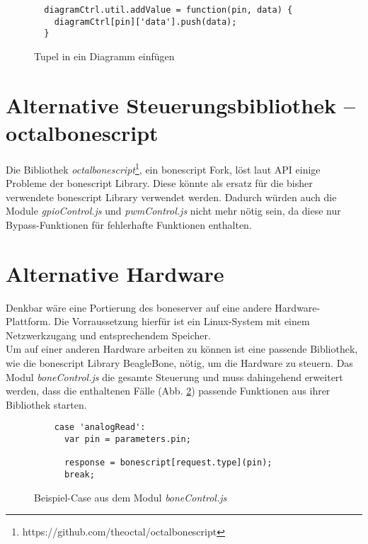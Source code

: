 \begin{figure}[H]
  \begin{lstlisting}
  diagramCtrl.util.addValue = function(pin, data) {
    diagramCtrl[pin]['data'].push(data);
  }
  \end{lstlisting}
  \caption{Tupel in ein Diagramm einfügen}
  \label{lst:insertTupel}
\end{figure}


\section{Alternative Steuerungsbibliothek -- octalbonescript}
Die Bibliothek \textit{octalbonescript}\footnote{https://github.com/theoctal/octalbonescript}, ein bonescript Fork, löst laut API einige Probleme der bonescript Library. Diese könnte als ersatz für die bisher verwendete bonescript Library verwendet werden. Dadurch würden auch die Module \textit{gpioControl.js} und \textit{pwmControl.js} nicht mehr nötig sein, da diese nur Bypass-Funktionen für fehlerhafte Funktionen enthalten.


\section{Alternative Hardware}
Denkbar wäre eine Portierung des boneserver auf eine andere Hardware-Plattform. Die Vorraussetzung hierfür ist ein Linux-System mit einem Netzwerkzugang und entsprechendem Speicher.\\

Um auf einer anderen Hardware arbeiten zu können ist eine passende Bibliothek, wie die bonescript Library BeagleBone, nötig, um die Hardware zu steuern. Das Modul \textit{boneControl.js} die gesamte Steuerung und muss dahingehend erweitert werden, dass die enthaltenen Fälle (Abb. \ref{lst:exampleCase}) passende Funktionen aus ihrer Bibliothek starten.

\begin{figure}[H]
  \begin{lstlisting}
    case 'analogRead':
      var pin = parameters.pin;

      response = bonescript[request.type](pin);
      break;
  \end{lstlisting}
  \caption{Beispiel-Case aus dem Modul \textit{boneControl.js}}
  \label{lst:exampleCase}
\end{figure}